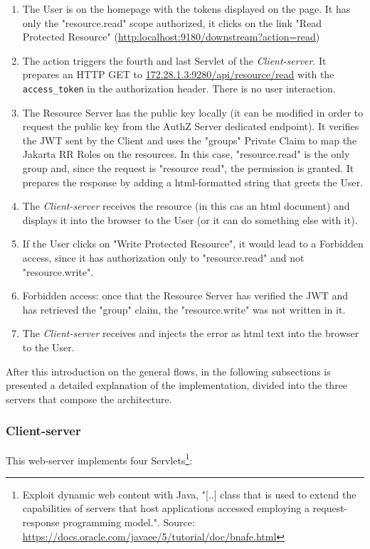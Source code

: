 \begin{enumerate}
    \item The User is on the homepage with the tokens displayed on the page. It has only the "resource.read" scope authorized, it clicks on the link "Read Protected Resource" (\url{http:localhost:9180/downstream?action=read})
    \item The action triggers the fourth and last Servlet of the \textit{Client-server}. It prepares an HTTP GET to \url{172.28.1.3:9280/api/resource/read} with the \texttt{access\_token} in the authorization header. There is no user interaction.
    \item The Resource Server has the public key locally (it can be modified in order to request the public key from the AuthZ Server dedicated endpoint). It verifies the JWT sent by the Client and uses the "groups" Private Claim to map the Jakarta RR Roles on the resources. In this case, "resource.read" is the only group and, since the request is "resource read", the permission is granted. It prepares the response by adding a html-formatted string that greets the User.
    \item The \textit{Client-server} receives the resource (in this cas an html document) and displays it into the browser to the User (or it can do something else with it).
    \item If the User clicks on "Write Protected Resource", it would lead to a Forbidden access, since it has authorization only to "resource.read" and not "resource.write".
    \item Forbidden access: once that the Resource Server has verified the JWT and has retrieved the "group" claim, the "resource.write" was not written in it.
    \item The \textit{Client-server} receives and injects the error as html text into the browser to the User.
\end{enumerate}

After this introduction on the general flows, in the following subsections is presented a detailed explanation of the implementation, divided into the three servers that compose the architecture.

\subsubsection{Client-server}
This web-server implements four Servlets\footnote{Exploit dynamic web content with Java, "[..] class that is used to extend the capabilities of servers that host applications accessed employing a request-response programming model.". Source: \url{https://docs.oracle.com/javaee/5/tutorial/doc/bnafe.html}}:

